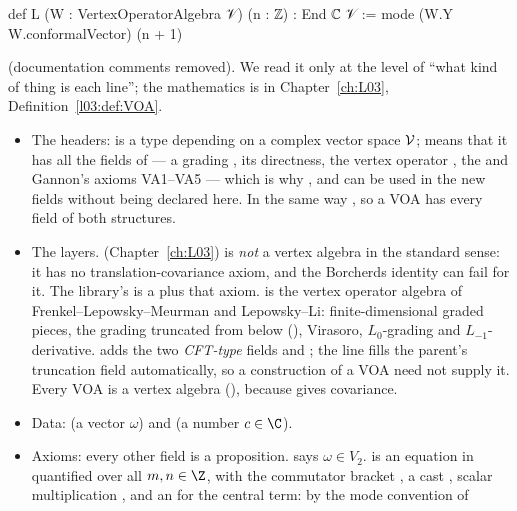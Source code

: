 \begin{example}
\begin{leancode}
def L (W : VertexOperatorAlgebra 𝒱) (n : ℤ) : End ℂ 𝒱 :=
  mode (W.Y W.conformalVector) (n + 1)
\end{leancode}
(documentation comments removed). We read it only at the level of ``what kind of thing is each
line''; the mathematics is in Chapter~\ref{ch:L03}, Definition~\ref{l03:def:VOA}.
\begin{itemize}
\item The headers:  is a type depending on a complex vector space
  $\mathcal{V}$;  means that it has all the fields of
   --- a grading , its directness, the
  vertex operator , the  and Gannon's axioms VA1--VA5
  --- which is why ,  and  can be used in the new fields
  without being declared here. In the same way  , so a VOA has every field of both structures.
\item The layers.  (Chapter~\ref{ch:L03}) is \emph{not} a vertex algebra in the
  standard sense: it has no translation-covariance axiom, and the Borcherds identity can fail for it.
  The library's  is a  plus that axiom.
   is the vertex operator algebra of Frenkel--Lepowsky--Meurman and
  Lepowsky--Li: finite-dimensional graded pieces, the grading truncated from below
  (), Virasoro, $L_0$-grading and $L_{-1}$-derivative.
   adds the two \emph{CFT-type} fields  and
  ; the line  fills the parent's truncation
  field automatically, so a construction of a VOA need not supply it. Every VOA is a vertex algebra
  (), because  gives covariance.
\item Data:  (a vector $\omega$) and  (a number
  $c\in\C$).
\item Axioms: every other field is a proposition.  says $\omega\in V_2$.
   is an equation in  quantified over all $m,n\in\Z$, with the
  commutator bracket , a cast , scalar multiplication , and an
   for the central term: by the mode convention of

\end{itemize}
\end{example}
